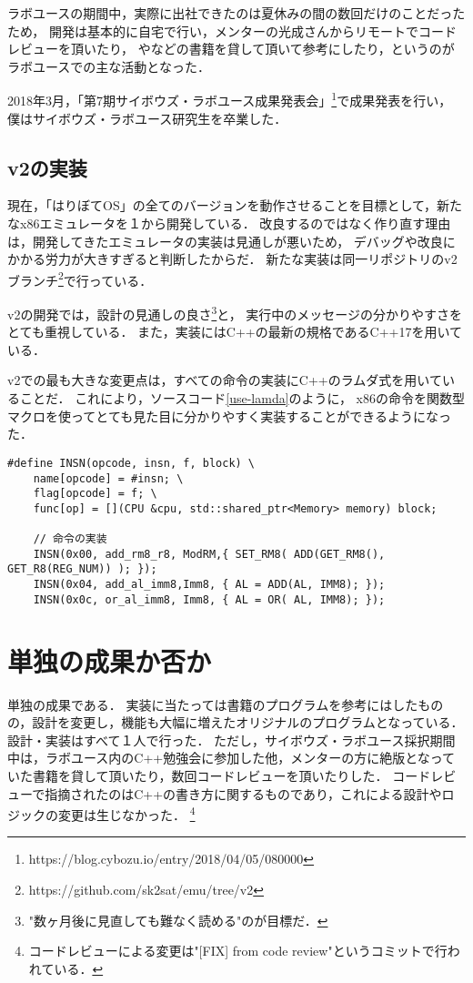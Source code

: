 \documentclass[10pt,a4j]{jsarticle}
\begin{document}
ラボユースの期間中，実際に出社できたのは夏休みの間の数回だけのことだったため，
開発は基本的に自宅で行い，メンターの光成さんからリモートでコードレビューを頂いたり，
\cite{read-486}や\cite{effective-cpp}などの書籍を貸して頂いて参考にしたり，というのがラボユースでの主な活動となった．


2018年3月，「第7期サイボウズ・ラボユース成果発表会」\footnote{https://blog.cybozu.io/entry/2018/04/05/080000}で成果発表を行い，
僕はサイボウズ・ラボユース研究生を卒業した．

\subsection{v2の実装}

現在，「はりぼてOS」の全てのバージョンを動作させることを目標として，新たなx86エミュレータを１から開発している．
改良するのではなく作り直す理由は，開発してきたエミュレータの実装は見通しが悪いため，
デバッグや改良にかかる労力が大きすぎると判断したからだ．
新たな実装は同一リポジトリのv2ブランチ\footnote{https://github.com/sk2sat/emu/tree/v2}で行っている．

v2の開発では，設計の見通しの良さ\footnote{"数ヶ月後に見直しても難なく読める"のが目標だ．}と，
実行中のメッセージの分かりやすさをとても重視している．
また，実装にはC++の最新の規格であるC++17を用いている．

v2での最も大きな変更点は，すべての命令の実装にC++のラムダ式を用いていることだ．
これにより，ソースコード\ref{use-lamda}のように，
x86の命令を関数型マクロを使ってとても見た目に分かりやすく実装することができるようになった．

\begin{lstlisting}[caption=ラムダ式を使った命令の実装の一部,label=use-lamda]
#define INSN(opcode, insn, f, block) \
	name[opcode] = #insn; \
	flag[opcode] = f; \
	func[op] = [](CPU &cpu, std::shared_ptr<Memory> memory) block;

	// 命令の実装
	INSN(0x00, add_rm8_r8, ModRM,{ SET_RM8( ADD(GET_RM8(), GET_R8(REG_NUM)) ); });
	INSN(0x04, add_al_imm8,Imm8, { AL = ADD(AL, IMM8); });
	INSN(0x0c, or_al_imm8, Imm8, { AL = OR( AL, IMM8); });
\end{lstlisting}

\section{単独の成果か否か}
単独の成果である．
実装に当たっては書籍\cite{learn-x86-by-emu}のプログラムを参考にはしたものの，設計を変更し，機能も大幅に増えたオリジナルのプログラムとなっている．
設計・実装はすべて１人で行った．
ただし，サイボウズ・ラボユース採択期間中は，ラボユース内のC++勉強会に参加した他，メンターの方に絶版となっていた書籍\cite{read-486}を貸して頂いたり，数回コードレビューを頂いたりした．
コードレビューで指摘されたのはC++の書き方に関するものであり，これによる設計やロジックの変更は生じなかった．
\footnote{コードレビューによる変更は"[FIX] from code review"というコミットで行われている．}
\end{document}
